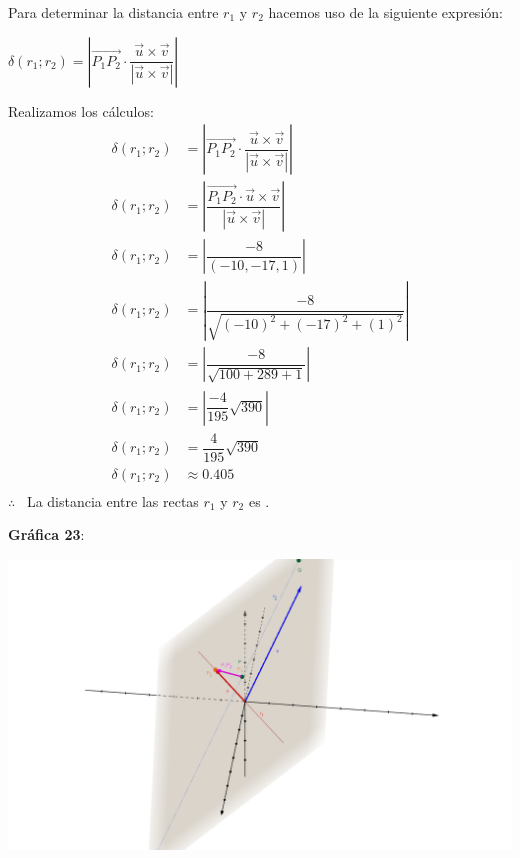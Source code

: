 \noindent Para determinar la distancia entre $r_1$ y $r_2$ hacemos uso de la siguiente expresión:

\begin{center}
	$\boxed{\delta(r_1;r_2) = \left|\overrightarrow{P_1P_2} \cdot \dfrac{\vec{u} \times \vec{v}}{|\vec{u} \times \vec{v}|} \right|}$
\end{center}

\noindent Realizamos los cálculos:
\begin{align*}
	\delta(r_1;r_2) & = \left|\overrightarrow{P_1P_2} \cdot \dfrac{\vec{u} \times \vec{v}}{|\vec{u} \times \vec{v}|} \right| \\
	\delta(r_1;r_2) & = \left|\dfrac{\overrightarrow{P_1P_2} \cdot \vec{u} \times \vec{v}}{|\vec{u} \times \vec{v}|} \right| \\
	\delta(r_1;r_2) & = \left|\dfrac{-8}{(-10, -17, 1)} \right|                                                              \\
	\delta(r_1;r_2) & = \left|\dfrac{-8}{\sqrt{(-10)^2 + (-17)^2 +  (1)^2}} \right|                                          \\
	\delta(r_1;r_2) & = \left|\dfrac{-8}{\sqrt{100 + 289 +  1}} \right|                                                      \\
	\delta(r_1;r_2) & = \left|\dfrac{-4}{195}\sqrt{390} \right|                                                              \\
	\delta(r_1;r_2) & = \dfrac{4}{195}\sqrt{390}                                                                             \\
	\delta(r_1;r_2) & \approx 0.405                                                                                          \\
\end{align*}
$\therefore$ \ La distancia entre las rectas $r_1$ y $r_2$ es .

\newpage
\noindent \textbf{Gráfica 23}:
\begin{center}
	\href{https://www.geogebra.org/3d/ghqqu7e7}{\includegraphics[width=15cm, scale=1]{TP-MATEMATICA-EJ23.png}}
\end{center}
